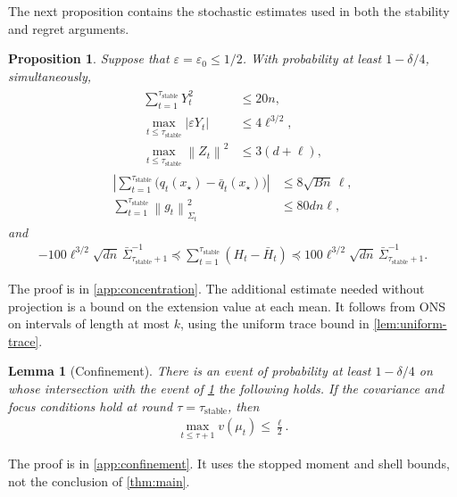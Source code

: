 \documentclass{article}
\newtheorem{proposition}[proposition]{Proposition}
\newtheorem{lemma}[lemma]{Lemma}
\newcommand{\1}{\mathbf 1}
\newcommand{\eps}{\varepsilon}
\newcommand{\norm}[1]{\left\lVert #1\right\rVert}
\newcommand{\normm}[2]{\left\lVert #1\right\rVert_{#2}}
\begin{document}
The next proposition contains the stochastic estimates used in both the
stability and regret arguments.
\begin{proposition}
    \label{prop:concentration}
    Suppose that $\eps=\eps_0\leq1/2$. With probability at least
    $1-\delta/4$, simultaneously,
    \begin{align}
        \begin{aligned}
            \sum_{t=1}^{\tau_{\mathrm{stable}}}Y_t^2       & \leq20n,
            \\
            \max_{t\leq\tau_{\mathrm{stable}}}|\eps Y_t|   & \leq4\ell^{3/2},
            \\
            \max_{t\leq\tau_{\mathrm{stable}}}\norm{Z_t}^2 & \leq3(d+\ell),
        \end{aligned}
        \label{eq:stopped-increment-bounds}
    \end{align}
    \begin{align}
        \left|
        \sum_{t=1}^{\tau_{\mathrm{stable}}}
        \bigl(q_t(x_\star)-\bar{q}_t(x_\star)\bigr)
        \right|
         & \leq8\sqrt{Bn}\,\ell,
        \label{eq:q-concentration}
        \\
        \sum_{t=1}^{\tau_{\mathrm{stable}}}
        \normm{g_t}{\Sigma_t}^2
         & \leq80dn\ell,
        \label{eq:gradient-energy}
    \end{align}
    and
    \begin{align}
        -100\ell^{3/2}\sqrt{dn}\,
        \bar{\Sigma}_{\tau_{\mathrm{stable}}+1}^{-1}
        \preceq
        \sum_{t=1}^{\tau_{\mathrm{stable}}}(H_t-\bar{H}_t)
        \preceq
        100\ell^{3/2}\sqrt{dn}\,
        \bar{\Sigma}_{\tau_{\mathrm{stable}}+1}^{-1}.
        \label{eq:H-concentration}
    \end{align}
\end{proposition}
The proof is in \cref{app:concentration}. The additional estimate needed
without projection is a bound on the extension value at each mean.
It follows from ONS on intervals of length at most $k$, using the
uniform trace bound in \cref{lem:uniform-trace}.
\begin{lemma}[Confinement]
    \label{lem:confinement}
    There is an event of probability at least $1-\delta/4$ on whose
    intersection with the event of \cref{prop:concentration} the following
    holds. If the covariance and focus conditions hold at round
    $\tau=\tau_{\mathrm{stable}}$, then
    \begin{align}
        \max_{t\leq\tau+1}v(\mu_t)\leq\frac\ell2.
        \label{eq:confinement}
    \end{align}
\end{lemma}
The proof is in \cref{app:confinement}. It uses the stopped moment and
shell bounds, not the conclusion of \cref{thm:main}.
\end{document}
